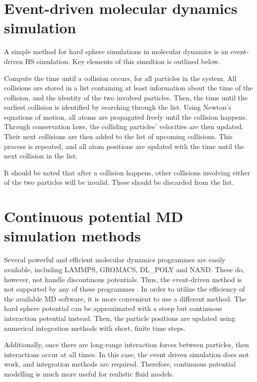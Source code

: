 \section{Event-driven molecular dynamics simulation}
A simple method for hard sphere simulations in molecular dynamics is an
event-driven HS simulation.
Key elements of this simultion is outlined below.

Compute the time until a collision occurs, for all particles in the system.
All collisions are stored in a list containing at least information about
the time of the collision, and the identity of the two involved particles.
Then, the time until the earliest collision is identified by searching through the list.
Using Newton's equations of motion, all atoms are propagated freely until
the collision happens.
Through conservation laws, the colliding particles' velocities are then updated.
Their next collisions are then added to the list of upcoming collisions.
This process is repeated, and all atom positions are updated with the time 
until the next collision in the list.

It should be noted that after a collision happens, other collisions involving
either of the two particles will be invalid.
These should be discarded from the list.

\section{Continuous potential MD simulation methods}
Several powerful and efficient molecular dynamics programmes are easily 
available, including LAMMPS, GROMACS, DL\_POLY and NAND. %
These do, however, not handle discontinous potentials.
Thus, the event-driven method is not supported by any of these programmes \cite{ref:allen:MD_sim}.
In order to utilize the efficiency of the available MD software, it is more convenient to use a different method.
The hard sphere potential can be approximated with a steep but continuous interaction potential instead.
Then, the particle positions are updated using numerical integration methods with short, finite time steps.

Additionally, once there are long-range interaction forces 
between particles, then interactions occur at all times.
In this case, the event driven simulation does not 
work, and integration methods are required.
Therefore, continuous potential modelling 
is much more useful for realistic fluid models.

